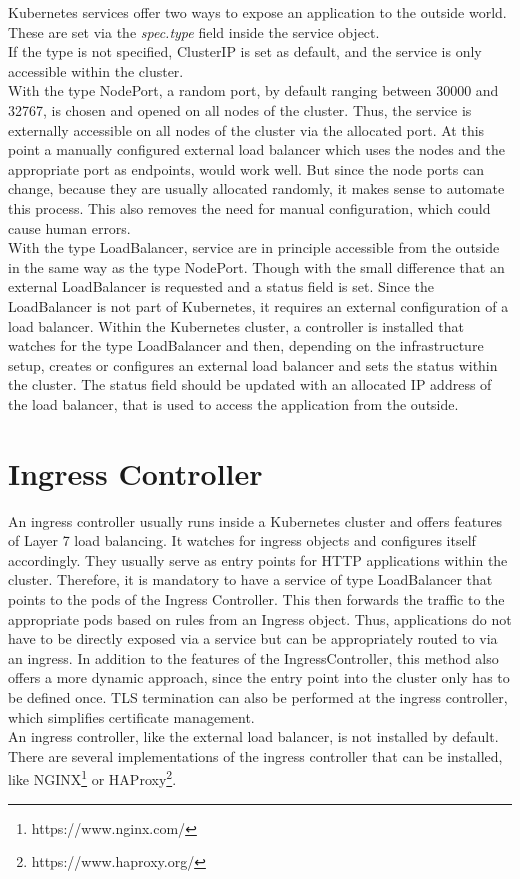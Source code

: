 Kubernetes services offer two ways to expose an application to the outside world.
These are set via the \textit{spec.type} field inside the service object.
\\
If the type is not specified, ClusterIP is set as default, and the service is only accessible within the cluster.
\\
With the type NodePort, a random port, by default ranging between 30000 and 32767, is chosen and opened on all nodes of the cluster.
Thus, the service is externally accessible on all nodes of the cluster via the allocated port.
At this point a manually configured external load balancer which uses the nodes and the appropriate port as endpoints, would work well.
But since the node ports can change, because they are usually allocated randomly, it makes sense to automate this process.
This also removes the need for manual configuration, which could cause human errors.
\\
With the type LoadBalancer, service are in principle accessible from the outside in the same way as the type NodePort.
Though with the small difference that an external LoadBalancer is requested and a status field is set.
Since the LoadBalancer is not part of Kubernetes, it requires an external configuration of a load balancer.
Within the Kubernetes cluster, a controller is installed that watches for the type LoadBalancer and then, depending on the infrastructure setup, creates or configures an external load balancer and sets the status within the cluster.
The status field should be updated with an allocated IP address of the load balancer, that is used to access the application from the outside.~\cite{KUBERNETES-SERVICE}

\section{Ingress Controller}\label{sec:IngressController}

An ingress controller usually runs inside a Kubernetes cluster and offers features of Layer 7 load balancing.
It watches for ingress objects and configures itself accordingly.
They usually serve as entry points for HTTP applications within the cluster.
Therefore, it is mandatory to have a service of type LoadBalancer that points to the pods of the Ingress Controller.
This then forwards the traffic to the appropriate pods based on rules from an Ingress object.
Thus, applications do not have to be directly exposed via a service but can be appropriately routed to via an ingress.
In addition to the features of the IngressController, this method also offers a more dynamic approach, since the entry point into the cluster only has to be defined once.
TLS termination can also be performed at the ingress controller, which simplifies certificate management.~\cite{KUBERNETES-INGRESS}
\\
An ingress controller, like the external load balancer, is not installed by default.
There are several implementations of the ingress controller that can be installed, like NGINX\footnote{https://www.nginx.com/} or HAProxy\footnote{https://www.haproxy.org/}.~\cite{KUBERNETES-INGRESS-CONTROLLER}

